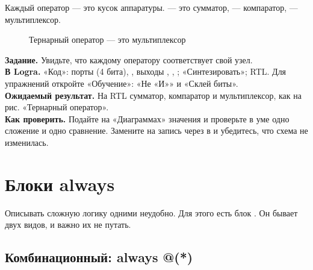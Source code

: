 Каждый оператор --- это кусок аппаратуры.  --- это сумматор,
 --- компаратор,  --- мультиплексор.

\begin{figure}[H]
\centering
{}
\caption{Тернарный оператор  --- это мультиплексор}
\end{figure}

\begin{diybox}
\textbf{Задание.} Увидьте, что каждому оператору соответствует свой узел.\\
\textbf{В Logra.} «Код»: порты  (4 бита), , выходы , , ; «Синтезировать»; RTL. Для упражнений откройте «Обучение»: «Не «И»» и «Склей биты».\\
\textbf{Ожидаемый результат.} На RTL сумматор, компаратор и мультиплексор, как на рис. «Тернарный оператор».\\
\textbf{Как проверить.} Подайте на «Диаграммах» значения и проверьте в уме одно сложение и одно сравнение.  Замените  на запись через  в  и убедитесь, что схема не изменилась.
\end{diybox}

\section{Блоки always}
\label{sec:always}

Описывать сложную логику одними  неудобно. Для этого есть блок
. Он бывает двух видов, и важно их не путать.

\subsection{Комбинационный: always @(*)}

